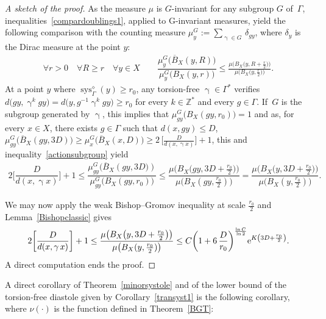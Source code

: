 \documentclass[10pt,a4paper]{amsart}
\numberwithin{equation}{section}
\newcommand{\Z}{\mathbb{Z}}
\newcommand{\sys}{\operatorname{sys}}
\newcommand{\g}{\operatorname{\gamma}}
\begin{document}
\begin{proof}[A sketch of the proof]
As the measure $\mu$ is $G$-invariant for any subgroup $G$ of~$\Gamma$, inequalities~\eqref{compardoublings1}, applied to G-invariant measures, yield the following comparison with the counting measure $\mu_{y}^{G} := \sum_{\g \in G}\, \delta_{g y}$, where $\delta_y$ is the Dirac measure at
the point $y$:
\begin{gather}\label{actionsubgroup}
\forall r > 0\quad \forall R\ge r \quad \forall y \in X \qquad
\dfrac{\mu_{y}^{G} \big(\overline B_X(y, R)\big)}{\mu_{y}^{G}\big(B_X(y, r)\big)}
\le \frac{\mu \big(B_X \big(y, R + \frac{r}{2}\big)\big)}{\mu \big(B_X \big(y, \frac{r}{2}\big)\big)}.
\end{gather}
At a point $y$ where $\sys^{\diamond}_\Gamma (y) \ge r_0$, any torsion-free $\g \in \Gamma^*$ verifies
$d\big(g y, \g^k g y\big) = d \big(y, g^{-1} \g^k g y\big) \ge r_0$ for every $k \in \Z^*$ and every $g \in \Gamma$. If~$G$ is the subgroup generated by $\g$, this
implies that $\mu_{g y}^{G} \big(B_X ( g y, r_0)\big) = 1$ and as, for every $x \in X$, there exists $g \in \Gamma$ such that $d(x, g y) \le D$,
$\mu_{gy}^{G} \big(\overline B_X(g y, 3 D)\big) \ge \mu_{x}^{G} \big(\overline B_X(x, D )\big) \ge 2\, \big[\frac{D}{d(x, \g x)}\big] + 1$, this and inequality~\eqref{actionsubgroup} yield
\begin{gather}\label{minorsystoleeq}
2\bigg[\dfrac{D}{d(x, \g x)}\bigg] \!+ 1 \le \dfrac{\mu_{gy}^{G} \big(\overline B_X(g y,3 D\big))} {\mu_{g y}^{G} \big(B_X (g y, r_0)\big)}
\le \dfrac{\mu \big(B_X \big( g y,3 D\! +\! \frac{r_0}{2}\big)\big)}{\mu \big(B_X(gy, \frac{r_0}{2})\big)} =\dfrac{\mu \big(B_X \big( y, 3 D \!+\! \frac{r_0}{2}\big)\big)}{\mu \big(B_X (y, \frac{r_0}{2})\big)}.\!\!
\end{gather}

We may now apply the weak Bishop--Gromov inequality at scale $\frac{r_0}{2}$ and Lemma~\ref{Bishopclassic} gives
\begin{gather*}
2 \bigg[ \dfrac{D}{d(x, \g x)}\bigg] + 1 \le \dfrac{\mu \big(B_X \big(y, 3D + \frac{r_0}{2}\big)\big)}{\mu \big( B_X ( y, \frac{r_0}{2})\big)}
\le C\bigg(1 + 6\,\frac{D}{r_0}\bigg)^{\frac{\ln C}{\ln 2}} {\rm e}^{K\left(3D + \frac{r_0}{2}\right)}.
\end{gather*}
A direct computation ends the proof.
\end{proof}

A direct corollary of Theorem~\ref{minorsystole} and of the lower bound of the torsion-free diastole given by Corollary~\ref{transyst1} is the following corollary,
where $ \nu (\cdot)$ is the function defined in Theorem~\ref{BGT}:
\end{document}
